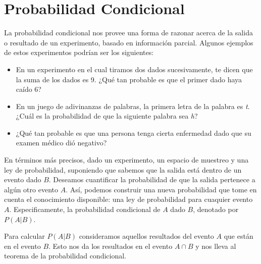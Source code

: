 
\section{Probabilidad Condicional}

La probabilidad condicional nos provee una forma de razonar acerca de la salida
o resultado de un experimento, basado en información parcial. Algunos ejemplos
de estos experimentos podrían ser los siguientes:

\begin{itemize}
\item En un experimento en el cual tiramos dos dados sucesivamente, te dicen que
la suma de los dados es 9. ¿Qué tan probable es que el primer dado haya caído 6?

\item En un juego de adivinanzas de palabras, la primera letra de la palabra es
\textit{t}. ¿Cuál es la probabilidad de que la siguiente palabra sea \textit{h}?

\item ¿Qué  tan probable es que una persona tenga cierta enfermedad dado que su
examen médico dió negativo?
\end{itemize}

En términos más precisos, dado un experimento, un espacio de muestreo y una ley
de probabilidad, suponiendo que sabemos que la salida está dentro de un evento
dado $B$. Deseamos cuantificar la probabilidad de que la salida pertenece a
algún otro evento $A$. Así, podemos construir una nueva probabilidad que tome en
cuenta el conocimiento disponible: una ley de probabilidad para cuaquier evento
$A$. Especificamente, la probabilidad condicional de $A$ dado $B$, denotado por
$P(A|B)$.

Para calcular $P(A|B)$ consideramos aquellos resultados del evento $A$ que están en
el evento $B$. Esto nos da los resultados en el evento $A \cap B$ y nos lleva al
teorema de la probabilidad condicional.

